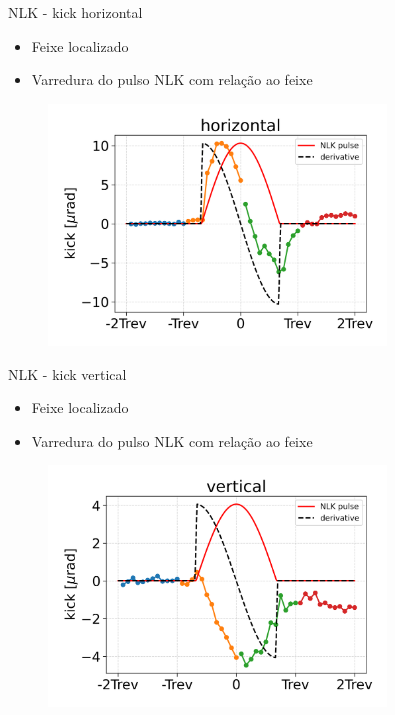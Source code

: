 \documentclass{beamer}					  %
\begin{document}
\begin{frame}{NLK - kick horizontal}
    \scriptsize{\begin{itemize}
    		\item Feixe localizado
            \item Varredura do pulso NLK com relação ao feixe
    \end{itemize}}
    \begin{figure}[H]
        	\centering
            \includegraphics[width=0.8\textwidth]{2024-02-16/figures/nlk_horizontal_kick_profile.png}
            \label{fig:nlk-h-kick-profile}
    \end{figure} 
\end{frame}

\begin{frame}{NLK - kick vertical}
    \scriptsize{\begin{itemize}
    		\item Feixe localizado
            \item Varredura do pulso NLK com relação ao feixe
    \end{itemize}}
    \begin{figure}[H]
        	\centering
            \includegraphics[width=0.8\textwidth]{2024-02-16/figures/nlk_vertical_kick_profile.png}
            \label{fig:nlk-v-kick-profile}
    \end{figure} 
\end{frame}
\end{document}
